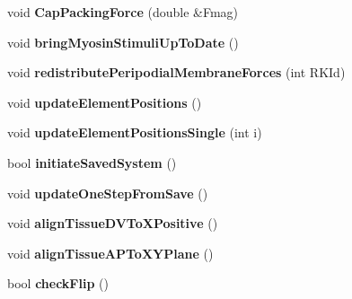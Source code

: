 \begin{DoxyCompactItemize}
\item 
\hypertarget{classSimulation_a33120f358a608cf6ede1a45715a8f990}{}void {\bfseries Cap\+Packing\+Force} (double \&Fmag)\label{classSimulation_a33120f358a608cf6ede1a45715a8f990}

\item 
\hypertarget{classSimulation_a85e729bc4b2fcf4a1a44f66552554208}{}void {\bfseries bring\+Myosin\+Stimuli\+Up\+To\+Date} ()\label{classSimulation_a85e729bc4b2fcf4a1a44f66552554208}

\item 
\hypertarget{classSimulation_a0f2aafedd2ceaab7ef60b9493aa98b21}{}void {\bfseries redistribute\+Peripodial\+Membrane\+Forces} (int R\+K\+Id)\label{classSimulation_a0f2aafedd2ceaab7ef60b9493aa98b21}

\item 
\hypertarget{classSimulation_aa92f90b98dc049a3206b4906ebf52585}{}void {\bfseries update\+Element\+Positions} ()\label{classSimulation_aa92f90b98dc049a3206b4906ebf52585}

\item 
\hypertarget{classSimulation_ab9fc29a2decb03a07e31e3ebb8801aec}{}void {\bfseries update\+Element\+Positions\+Single} (int i)\label{classSimulation_ab9fc29a2decb03a07e31e3ebb8801aec}

\item 
\hypertarget{classSimulation_a6ef90fd76ed4f6bb9d063e7e72e9a983}{}bool {\bfseries initiate\+Saved\+System} ()\label{classSimulation_a6ef90fd76ed4f6bb9d063e7e72e9a983}

\item 
\hypertarget{classSimulation_a1f5dbbde572af555225089e247296e2e}{}void {\bfseries update\+One\+Step\+From\+Save} ()\label{classSimulation_a1f5dbbde572af555225089e247296e2e}

\item 
\hypertarget{classSimulation_a91a12f6ac1b230cecbe004221326a7ca}{}void {\bfseries align\+Tissue\+D\+V\+To\+X\+Positive} ()\label{classSimulation_a91a12f6ac1b230cecbe004221326a7ca}

\item 
\hypertarget{classSimulation_a4d865136f9cb930b986af8bc86b6bd10}{}void {\bfseries align\+Tissue\+A\+P\+To\+X\+Y\+Plane} ()\label{classSimulation_a4d865136f9cb930b986af8bc86b6bd10}

\item 
\hypertarget{classSimulation_a7aa2db4c2819e37c0ded181d47467233}{}bool {\bfseries check\+Flip} ()\label{classSimulation_a7aa2db4c2819e37c0ded181d47467233}


\end{DoxyCompactItemize}
